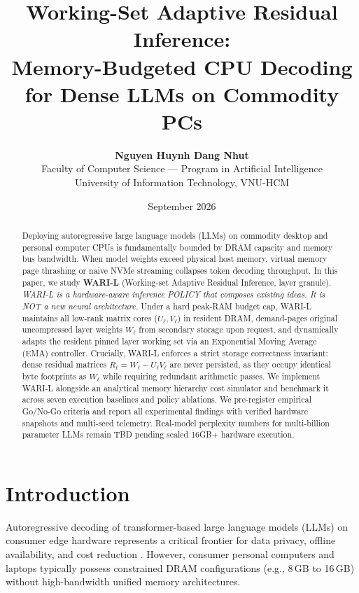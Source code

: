 \documentclass[11pt,a4paper]{article}
\title{\textbf{Working-Set Adaptive Residual Inference: \\ Memory-Budgeted CPU Decoding for Dense LLMs on Commodity PCs}}
\author{
    \textbf{Nguyen Huynh Dang Nhut} \\
    Faculty of Computer Science --- Program in Artificial Intelligence \\
    University of Information Technology, VNU-HCM
}
\date{September 2026}
\begin{document}
\maketitle

\begin{abstract}
Deploying autoregressive large language models (LLMs) on commodity desktop and personal computer CPUs is fundamentally bounded by DRAM capacity and memory bus bandwidth. When model weights exceed physical host memory, virtual memory page thrashing or naive NVMe streaming collapses token decoding throughput. In this paper, we study \textbf{WARI-L} (Working-set Adaptive Residual Inference, layer granule). \textit{WARI-L is a hardware-aware inference POLICY that composes existing ideas. It is NOT a new neural architecture.} Under a hard peak-RAM budget cap, WARI-L maintains all low-rank matrix cores ($U_\ell, V_\ell$) in resident DRAM, demand-pages original uncompressed layer weights $W_\ell$ from secondary storage upon request, and dynamically adapts the resident pinned layer working set via an Exponential Moving Average (EMA) controller. Crucially, WARI-L enforces a strict storage correctness invariant: dense residual matrices $R_\ell = W_\ell - U_\ell V_\ell$ are never persisted, as they occupy identical byte footprints as $W_\ell$ while requiring redundant arithmetic passes. We implement WARI-L alongside an analytical memory hierarchy cost simulator and benchmark it across seven execution baselines and policy ablations. We pre-register empirical Go/No-Go criteria and report all experimental findings with verified hardware snapshots and multi-seed telemetry. Real-model perplexity numbers for multi-billion parameter LLMs remain TBD pending scaled 16GB+ hardware execution.
\end{abstract}

\section{Introduction}
Autoregressive decoding of transformer-based large language models (LLMs) on consumer edge hardware represents a critical frontier for data privacy, offline availability, and cost reduction \cite{wan2024efficient, xu2024ondevice}. However, consumer personal computers and laptops typically possess constrained DRAM configurations (e.g., 8\,GB to 16\,GB) without high-bandwidth unified memory architectures. 
\end{document}
